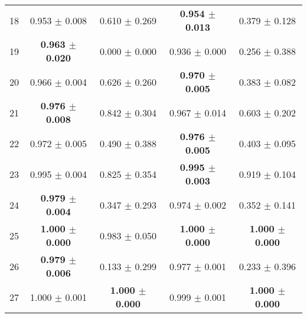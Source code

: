 \begin{table}[!ht]
{\begin{tabular}{r c c c c}
18 & 0.953 $\pm$ 0.008 & 0.610 $\pm$ 0.269 & \textbf{0.954 $\pm$ 0.013} & 0.379 $\pm$ 0.128 \\
19 & \textbf{0.963 $\pm$ 0.020} & 0.000 $\pm$ 0.000 & 0.936 $\pm$ 0.000 & 0.256 $\pm$ 0.388 \\
20 & 0.966 $\pm$ 0.004 & 0.626 $\pm$ 0.260 & \textbf{0.970 $\pm$ 0.005} & 0.383 $\pm$ 0.082 \\
21 & \textbf{0.976 $\pm$ 0.008} & 0.842 $\pm$ 0.304 & 0.967 $\pm$ 0.014 & 0.603 $\pm$ 0.202 \\
22 & 0.972 $\pm$ 0.005 & 0.490 $\pm$ 0.388 & \textbf{0.976 $\pm$ 0.005} & 0.403 $\pm$ 0.095 \\
23 & 0.995 $\pm$ 0.004 & 0.825 $\pm$ 0.354 & \textbf{0.995 $\pm$ 0.003} & 0.919 $\pm$ 0.104 \\
24 & \textbf{0.979 $\pm$ 0.004} & 0.347 $\pm$ 0.293 & 0.974 $\pm$ 0.002 & 0.352 $\pm$ 0.141 \\
25 & \textbf{1.000 $\pm$ 0.000} & 0.983 $\pm$ 0.050 & \textbf{1.000 $\pm$ 0.000} & \textbf{1.000 $\pm$ 0.000} \\
26 & \textbf{0.979 $\pm$ 0.006} & 0.133 $\pm$ 0.299 & 0.977 $\pm$ 0.001 & 0.233 $\pm$ 0.396 \\
27 & 1.000 $\pm$ 0.001 & \textbf{1.000 $\pm$ 0.000} & 0.999 $\pm$ 0.001 & \textbf{1.000 $\pm$ 0.000} \\
\end{tabular}}
\end{table}
